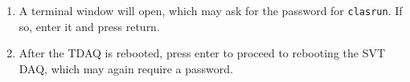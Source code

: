 \documentclass[letter,12pt]{article}
\begin{document}
\begin{enumerate}
\begin{minipage}[t]{0.15\textwidth}
\end{minipage}

\item 
\begin{minipage}[t]{0.35\textwidth}
A terminal window will open, which may ask for the password for \texttt{clasrun}.  If so, enter it and press return. 
\end{minipage}
\hspace*{0.0\textwidth}
\begin{minipage}[t]{0.55\textwidth}
\end{minipage}

\item 
\begin{minipage}[t]{0.35\textwidth}
After the TDAQ is rebooted, press enter to proceed to rebooting the SVT DAQ, which may again require a password.
\end{minipage}
\hspace*{0.0\textwidth}
\begin{minipage}[t]{0.55\textwidth}
\end{minipage}


\end{enumerate}
\end{document}
